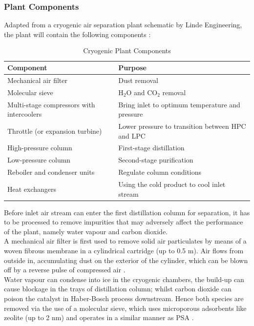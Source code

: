 	\subsubsection{Plant Components} \noindent
    Adapted from a cryogenic air separation plant schematic by Linde Engineering, the plant will contain the following components \citep{linde_cryo}:
    \begin{table}[ht]
        \singlespacing
    	\centering
	    \caption{Cryogenic Plant Components}
	    \label{table:plant_components}

	    \begin{tabular}{|l|l|}
	    \hline
	    Component						& Purpose \\        \hline
	    Mechanical air filter 			& Dust removal \\
	    Molecular sieve					& H$_2$O and CO$_2$ removal \\
	    Multi-stage compressors with intercoolers & Bring inlet to optimum temperature and pressure\\
	    Throttle (or expansion turbine)	& Lower pressure to transition between HPC and LPC\\
	    High-pressure column			& First-stage distillation \\
	    Low-pressure column				& Second-stage purification \\
	    Reboiler and condenser units	& Regulate column conditions\\
	    Heat exchangers					& Using the cold product to cool inlet stream \\  \hline
	    \end{tabular}
    \end{table}
        Before inlet air stream can enter the first distillation column for separation, it has to be processed to remove impurities that may adversely affect the performance of the plant, namely water vapour and carbon dioxide. \\
        A mechanical air filter is first used to remove solid air particulates by means of a woven fibrous membrane in a cylindrical cartridge (up to 0.5 \textmu m). Air flows from outside in, accumulating dust on the exterior of the cylinder, which can be blown off by a reverse pulse of compressed air \citep{airfilter}.\\
        Water vapour can condense into ice in the cryogenic chambers, the build-up can cause blockage in the trays of distillation column; whilst carbon dioxide can poison the catalyst in Haber-Bosch process downstream. Hence both species are removed via the use of a molecular sieve, which uses microporous adsorbents like zeolite (up to 2 nm) and operates in a similar manner as PSA \citep{white2017}.
